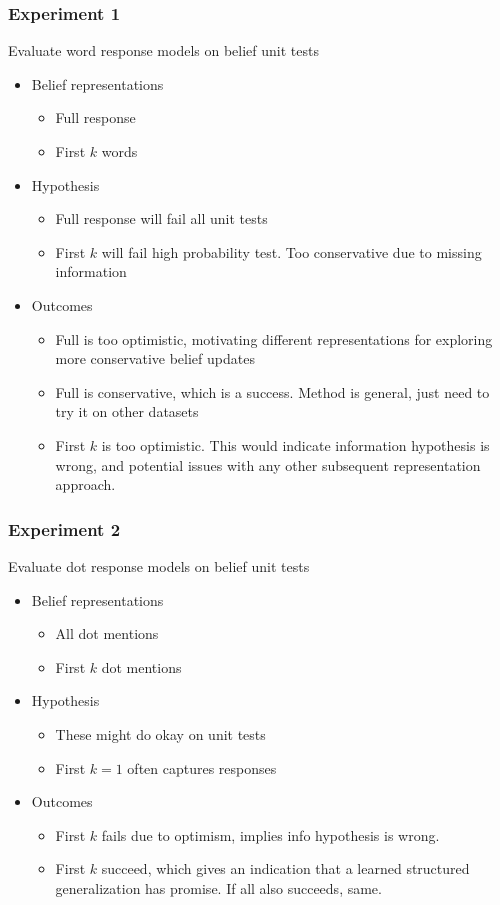 \documentclass{beamer}
\begin{document}
\begin{frame}
\frametitle{Experiment 1}
Evaluate word response models on belief unit tests
\begin{itemize}
\item Belief representations
    \begin{itemize}
    \item Full response
    \item First $k$ words
    \end{itemize}
\item Hypothesis
    \begin{itemize}
    \item Full response will fail all unit tests
    \item First $k$ will fail high probability test.
        Too conservative due to missing information
    \end{itemize}
\item Outcomes
    \begin{itemize}
    \item Full is too optimistic, motivating different representations
        for exploring more conservative belief updates
    \item Full is conservative, which is a success. Method is general,
        just need to try it on other datasets
    \item First $k$ is too optimistic. This would indicate
        information hypothesis is wrong, and
        potential issues with any other subsequent representation approach.
    \end{itemize}
\end{itemize}
\end{frame}

\begin{frame}
\frametitle{Experiment 2}
Evaluate dot response models on belief unit tests
\begin{itemize}
\item Belief representations
    \begin{itemize}
    \item All dot mentions
    \item First $k$ dot mentions
    \end{itemize}
\item Hypothesis
    \begin{itemize}
    \item These might do okay on unit tests
    \item First $k=1$ often captures responses
    \end{itemize}
\item Outcomes
    \begin{itemize}
    \item First $k$ fails due to optimism,
        implies info hypothesis is wrong.
    \item First $k$ succeed, which gives an indication that
        a learned structured generalization has promise.
        If all also succeeds, same.
    \end{itemize}
\end{itemize}
\end{frame}
\end{document}

